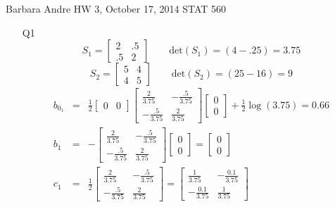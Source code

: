 \documentclass{article}
\begin{document}
Barbara Andre
HW 3, October 17, 2014
STAT 560

\begin{itemize}
\item[Q1]
\begin{equation*}
S_1 = \begin{bmatrix}
2 & .5 \\
.5 & 2 
\end{bmatrix} \qquad\text{det}(S_1) = (4 - .25) = 3.75
\end{equation*}
\begin{equation*}
S_2 = \begin{bmatrix}
5 & 4 \\
4 & 5 
\end{bmatrix} \qquad \text{det}(S_2) = (25 - 16) = 9
\end{equation*}
\begin{eqnarray*}
b_{0_1} & =  & \frac{1}{2} \begin{bmatrix}
0 & 0
\end{bmatrix} \begin{bmatrix}
\frac{2}{3.75} & -\frac{.5}{3.75} \\
-\frac{.5}{3.75} & \frac{2}{3.75}
\end{bmatrix}
\begin{bmatrix}
0 \\
0
\end{bmatrix} + \frac{1}{2} \log(3.75) = 0.66 \\
b_1 &  =  & -\begin{bmatrix}
\frac{2}{3.75} & -\frac{.5}{3.75} \\
-\frac{.5}{3.75} & \frac{2}{3.75}
\end{bmatrix} \begin{bmatrix}
0 \\ 0
\end{bmatrix} = \begin{bmatrix}
0 \\ 0
\end{bmatrix}\\
c_1 & = & \frac{1}{2} \begin{bmatrix}
\frac{2}{3.75} & -\frac{.5}{3.75} \\
-\frac{.5}{3.75} & \frac{2}{3.75}
\end{bmatrix}  = 
\begin{bmatrix}
\frac{1}{3.75} & -\frac{0.1}{3.75} \\
-\frac{0.1}{3.75} & \frac{1}{3.75}
\end{bmatrix}
\end{eqnarray*}

\end{itemize}
\end{document}
